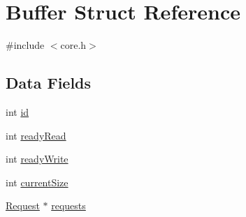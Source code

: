 \hypertarget{struct_buffer}{\section{Buffer Struct Reference}
\label{struct_buffer}
}


{\ttfamily \#include $<$core.\-h$>$}

\subsection*{Data Fields}
\begin{DoxyCompactItemize}
\item 
int \hyperlink{struct_buffer_a7441ef0865bcb3db9b8064dd7375c1ea}{id}
\item 
int \hyperlink{struct_buffer_a637e49c90b3423cfb2f0b99fecc1b4c3}{ready\-Read}
\item 
int \hyperlink{struct_buffer_aef94d326fece379f1cc2bfdbc297f448}{ready\-Write}
\item 
int \hyperlink{struct_buffer_a0c2f9a0a6941e32677f17cadd8626c6f}{current\-Size}
\item 
\hyperlink{struct_request}{Request} $\ast$ \hyperlink{struct_buffer_a9eaf7c28985896889d16ff7e5b43da32}{requests}
\end{DoxyCompactItemize}



